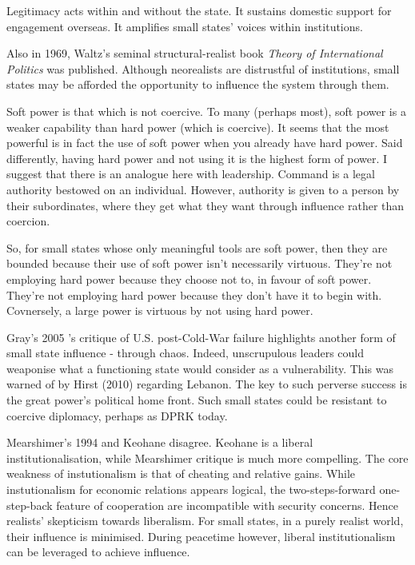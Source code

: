 Legitimacy acts within and without the state. It sustains domestic support for engagement overseas. It amplifies small states' voices within institutions. 



 


Also in 1969, Waltz's seminal structural-realist book \textit{Theory of International Politics} was published. Although neorealists are distrustful of institutions, small states may be afforded the opportunity to influence the system through them.


Soft power is that which is not coercive. To many (perhaps most), soft power is a weaker capability than hard power (which is coercive). It seems that the most powerful is in fact the use of soft power when you already have hard power. Said differently, having hard power and not using it is the highest form of power. I suggest that there is an analogue here with leadership. Command is a legal authority bestowed on an individual. However, authority is given to a person by their subordinates, where they get what they want through influence rather than coercion. 

So, for small states whose only meaningful tools are soft power, then they are bounded because their use of soft power isn't necessarily virtuous. They're not employing hard power because they choose not to, in favour of soft power. They're not employing hard power because they don't have it to begin with. Covnersely, a large power is virtuous by not using hard power.


Gray's 2005 \nocite{GRAY_2005}'s critique of U.S. post-Cold-War failure highlights another form of small state influence - through chaos. Indeed, unscrupulous leaders could weaponise what a functioning state would consider as a vulnerability. This was warned of by Hirst (2010) \nocite{HIRST_2010} regarding Lebanon. The key to such perverse success is the great power's political home front. Such small states could be resistant to coercive diplomacy, perhaps as DPRK today.

Mearshimer's 1994 \nocite{MEARSHIMER_1994} and Keohane \nocite{KEOHANE_1969} disagree. Keohane is a liberal institutionalisation, while Mearshimer critique is much more compelling. The core weakness of instutionalism is that of cheating and relative gains. While instutionalism for economic relations appears logical, the two-steps-forward one-step-back feature of cooperation are incompatible with security concerns. Hence realists' skepticism towards liberalism. For small states, in a purely realist world, their influence is minimised. During peacetime however, liberal institutionalism can be leveraged to achieve influence. 



